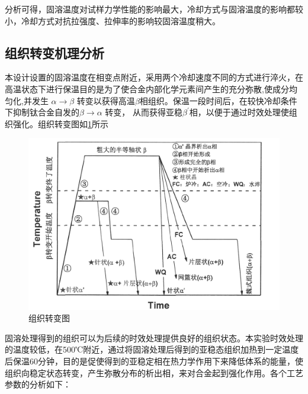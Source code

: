 分析可得，固溶温度对试样力学性能的影响最大，冷却方式与固溶温度的影响都较小，冷却方式对抗拉强度、拉伸率的影响较固溶温度稍大。

\subsection{组织转变机理分析}
本设计设置的固溶温度在相变点附近，采用两个冷却速度不同的方式进行淬火，在高温状态下进行保温目的是为了使合金内部化学元素间产生的充分弥散,使成分均匀化,并发生 $\alpha\to\beta$ 转变以获得高温$ \beta $相组织。保温一段时间后，在较快冷却条件下抑制钛合金自发的$\beta\to \alpha$ 转变， 从而获得亚稳$ \beta^{\prime} $相，以便于通过时效处理使组织强化。组织转变图如\ref{fig: micchange}所示


\begin{figure}[h!]
	\centering
	\includegraphics[width=0.7\linewidth]{pic/组织转变图}
	\caption{组织转变图}
	\label{fig: micchange}
\end{figure}


固溶处理得到的组织可以为后续的时效处理提供良好的组织状态。本实验时效处理的温度较低，在500℃附近，通过将固溶处理后得到的亚稳态组织加热到一定温度后保温60分钟，目的是促使得到的亚稳定相在热力学作用下来降低体系的能量，使组织向稳定状态转变，产生弥散分布的析出相，来对合金起到强化作用。各个工艺参数的分析如下：

